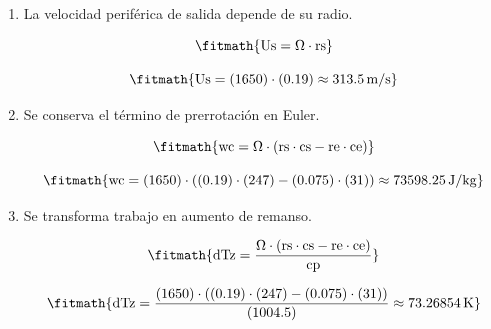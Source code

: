 \begin{enumerate}

\item La velocidad periférica de salida depende de su radio.

\[\fitmath{\mathrm{Us}=\Omega\cdot \mathrm{rs}}\]

\[\fitmath{\mathrm{Us}=(1650)\cdot (0.19)\approx 313.5\,\mathrm{m/s}}\]

\item Se conserva el término de prerrotación en Euler.

\[\fitmath{\mathrm{wc}=\Omega\cdot \left(\mathrm{rs}\cdot \mathrm{cs}-\mathrm{re}\cdot \mathrm{ce}\right)}\]

\[\fitmath{\mathrm{wc}=(1650)\cdot \left((0.19)\cdot (247)-(0.075)\cdot (31)\right)\approx 73598.25\,\mathrm{J/kg}}\]

\item Se transforma trabajo en aumento de remanso.

\[\fitmath{\mathrm{dTz}=\frac{\Omega\cdot \left(\mathrm{rs}\cdot \mathrm{cs}-\mathrm{re}\cdot \mathrm{ce}\right)}{\mathrm{cp}}}\]

\[\fitmath{\mathrm{dTz}=\frac{(1650)\cdot \left((0.19)\cdot (247)-(0.075)\cdot (31)\right)}{(1004.5)}\approx 73.26854\,\mathrm{K}}\]

\end{enumerate}
